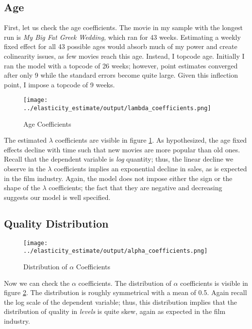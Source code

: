 \documentclass{article}
\begin{document}
\subsection{Age}

First, let us check the age coefficients. The movie in my sample with the longest run is \emph{My Big Fat Greek Wedding,} which ran for 43 weeks. Estimating a weekly fixed effect for all 43 possible ages would absorb much of my power and create colinearity issues, as few movies reach this age. Instead, I topcode age. Initially I ran the model with a topcode of 26 weeks; however, point estimates converged after only 9 while the standard errors become quite large. Given this inflection point, I impose a topcode of 9 weeks.

\begin{center}
    \begin{figure}
        \texttt{[image: ../elasticity\_estimate/output/lambda\_coefficients.png]}
        \caption{Age Coefficients}
        \label{fig:age_coefs}
    \end{figure}
\end{center}

The estimated $\lambda$ coefficients are visible in figure \ref{fig:age_coefs}. As hypothesized, the age fixed effects decline with time such that new movies are more popular than old ones. Recall that the dependent variable is \emph{log} quantity; thus, the linear decline we observe in the $\lambda$ coefficients implies an exponential decline in sales, as is expected in the film industry. Again, the model does not impose either the sign or the shape of the $\lambda$ coefficients; the fact that they are negative and decreasing suggests our model is well specified.

\subsection{Quality Distribution}

\begin{center}
    \begin{figure}
        \texttt{[image: ../elasticity\_estimate/output/alpha\_coefficients.png]}
        \caption{Distribution of $\alpha$ Coefficients}
        \label{fig:alpha_dist}
    \end{figure}
\end{center}

Now we can check the $\alpha$ coefficients. The distribution of $\alpha$ coefficients is visible in figure \ref{fig:alpha_dist}. The distribution is roughly symmetrical with a mean of 0.5. Again recall the log scale of the dependent variable; thus, this distribution implies that the distribution of quality in \emph{levels} is quite skew, again as expected in the film industry. 
\end{document}
